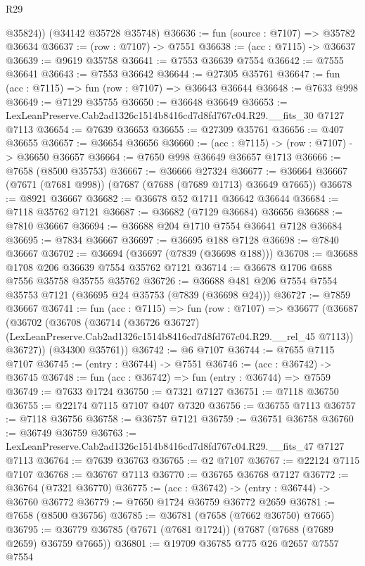 \begin{lexlean}{R29}
\begin{coremodule}
        @35824))
    (@34142 @35728 @35748)
@36636 := fun (source : @7107) => @35782 @36634
@36637 := (row : @7107) -> @7551
@36638 := (acc : @7115) -> @36637
@36639 := @9619 @35758
@36641 := @7553 @36639 @7554
@36642 := @7555 @36641
@36643 := @7553 @36642
@36644 := @27305 @35761
@36647 := fun (acc : @7115) => fun (row : @7107) => @36643 @36644
@36648 := @7633 @998
@36649 := @7129 @35755
@36650 := @36648 @36649
@36653 := LexLeanPreserve.Cab2ad1326c1514b8416cd7d8fd767c04.R29.__fits_30 @7127 @7113
@36654 := @7639 @36653
@36655 := @27309 @35761
@36656 := @407 @36655
@36657 := @36654 @36656
@36660 := (acc : @7115) -> (row : @7107) -> @36650 @36657
@36664 := @7650 @998 @36649 @36657 @1713
@36666 := @7658 (@8500 @35753)
@36667 := @36666 @27324
@36677 := @36664 @36667 (@7671 (@7681 @998)) (@7687 (@7688 (@7689 @1713) @36649 @7665))
@36678 := @8921 @36667
@36682 := @36678 @52 @1711 @36642 @36644
@36684 := @7118 @35762 @7121
@36687 := @36682 (@7129 @36684) @36656
@36688 := @7810 @36667
@36694 := @36688 @204 @1710 @7554 @36641 @7128 @36684
@36695 := @7834 @36667
@36697 := @36695 @188 @7128
@36698 := @7840 @36667
@36702 := @36694 (@36697 (@7839 (@36698 @188)))
@36708 := @36688 @1708 @206 @36639 @7554 @35762 @7121
@36714 := @36678 @1706 @688 @7556 @35758 @35755 @35762
@36726 := @36688 @481 @206 @7554 @7554 @35753 @7121 (@36695 @24 @35753 (@7839 (@36698 @24)))
@36727 := @7859 @36667
@36741 := fun (acc : @7115) =>
  fun (row : @7107) =>
  @36677
    (@36687
      (@36702
        (@36708
          (@36714
            (@36726 @36727)
            (LexLeanPreserve.Cab2ad1326c1514b8416cd7d8fd767c04.R29.__rel_45 @7113))
          @36727))
      (@34300 @35761))
@36742 := @6 @7107
@36744 := @7655 @7115 @7107
@36745 := (entry : @36744) -> @7551
@36746 := (acc : @36742) -> @36745
@36748 := fun (acc : @36742) => fun (entry : @36744) => @7559
@36749 := @7633 @1724
@36750 := @7321 @7127
@36751 := @7118 @36750
@36755 := @22174 @7115 @7107 @407 @7320
@36756 := @36755 @7113
@36757 := @7118 @36756
@36758 := @36757 @7121
@36759 := @36751 @36758
@36760 := @36749 @36759
@36763 := LexLeanPreserve.Cab2ad1326c1514b8416cd7d8fd767c04.R29.__fits_47 @7127 @7113
@36764 := @7639 @36763
@36765 := @2 @7107
@36767 := @22124 @7115 @7107
@36768 := @36767 @7113
@36770 := @36765 @36768 @7127
@36772 := @36764 (@7321 @36770)
@36775 := (acc : @36742) -> (entry : @36744) -> @36760 @36772
@36779 := @7650 @1724 @36759 @36772 @2659
@36781 := @7658 (@8500 @36756)
@36785 := @36781 (@7658 (@7662 @36750) @7665)
@36795 := @36779 @36785 (@7671 (@7681 @1724)) (@7687 (@7688 (@7689 @2659) @36759 @7665))
@36801 := @19709 @36785 @775 @26 @2657 @7557 @7554

\end{coremodule}
\end{lexlean}

